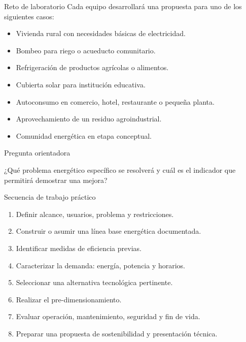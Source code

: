 \documentclass[aspectratio=169,10pt]{beamer}
\newcommand{\pregunta}[1]{
\begin{exampleblock}{Pregunta orientadora}
#1
\end{exampleblock}
}
\begin{document}
\begin{frame}{Reto de laboratorio}
Cada equipo desarrollará una propuesta para uno de los siguientes casos:

\begin{itemize}
    \item Vivienda rural con necesidades básicas de electricidad.
    \item Bombeo para riego o acueducto comunitario.
    \item Refrigeración de productos agrícolas o alimentos.
    \item Cubierta solar para institución educativa.
    \item Autoconsumo en comercio, hotel, restaurante o pequeña planta.
    \item Aprovechamiento de un residuo agroindustrial.
    \item Comunidad energética en etapa conceptual.
\end{itemize}

\pregunta{
¿Qué problema energético específico se resolverá y cuál es el indicador que permitirá demostrar una mejora?
}
\end{frame}

\begin{frame}{Secuencia de trabajo práctico}
\centering
\begin{enumerate}
    \item Definir alcance, usuarios, problema y restricciones.
    \item Construir o asumir una línea base energética documentada.
    \item Identificar medidas de eficiencia previas.
    \item Caracterizar la demanda: energía, potencia y horarios.
    \item Seleccionar una alternativa tecnológica pertinente.
    \item Realizar el pre-dimensionamiento.
    \item Evaluar operación, mantenimiento, seguridad y fin de vida.
    \item Preparar una propuesta de sostenibilidad y presentación técnica.
\end{enumerate}
\end{frame}
\end{document}
